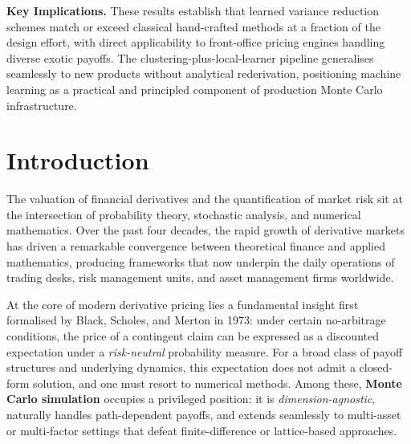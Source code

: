 \documentclass[12pt, a4paper]{report}
\theoremstyle{definition}
\begin{document}
\medskip
\noindent\textbf{Key Implications.}\enspace
These results establish that learned variance reduction schemes match or
exceed classical hand-crafted methods at a fraction of the design effort,
with direct applicability to front-office pricing engines handling diverse
exotic payoffs.  The clustering-plus-local-learner pipeline generalises
seamlessly to new products without analytical rederivation, positioning
machine learning as a practical and principled component of production
Monte Carlo infrastructure.

\cleardoublepage

\pagestyle{plain}
\setcounter{tocdepth}{2}

\renewcommand{\cftsecfont}{\normalsize}
\renewcommand{\cftchapleader}{\cftdotfill{\cftdotsep}}

\tableofcontents
\cleardoublepage

\pagestyle{fancy}

\chapter*{Introduction}

The valuation of financial derivatives and the quantification of market
risk sit at the intersection of probability theory, stochastic analysis,
and numerical mathematics.  Over the past four decades, the rapid growth
of derivative markets has driven a remarkable convergence between
theoretical finance and applied mathematics, producing frameworks that
now underpin the daily operations of trading desks, risk management
units, and asset management firms worldwide.

At the core of modern derivative pricing lies a fundamental insight first
formalised by Black, Scholes, and Merton in 1973: under certain
no-arbitrage conditions, the price of a contingent claim can be expressed
as a discounted expectation under a \emph{risk-neutral} probability
measure.  For a broad class of payoff structures and underlying dynamics,
this expectation does not admit a closed-form solution, and one must
resort to numerical methods.  Among these, \textbf{Monte Carlo
simulation} occupies a privileged position: it is \emph{dimension-agnostic},
naturally handles path-dependent payoffs, and extends seamlessly to
multi-asset or multi-factor settings that defeat finite-difference or
lattice-based approaches.
\end{document}
